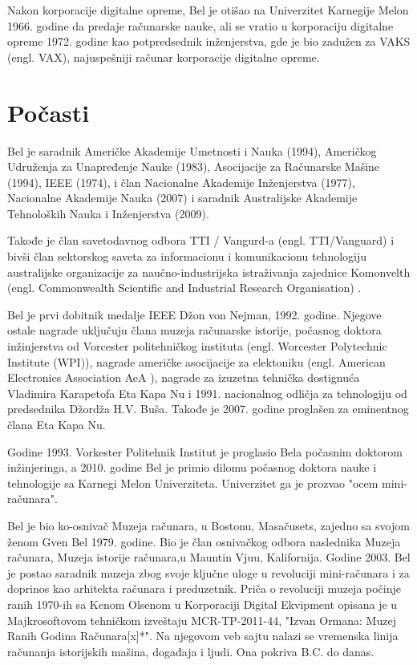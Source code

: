 \documentclass[a4paper]{article}
\begin{document}
{Nakon korporacije digitalne opreme, Bel je otišao na Univerzitet Karnegije Melon 1966. godine da predaje \-ra\-ču\-na\-rske nauke, ali se vratio u korporaciju digitalne opreme 1972. godine kao potpredsednik inženjerstva, gde je bio zadužen za VAKS (engl. VAX), najuspešniji računar korporacije digitalne opreme.


\section{Počasti}	
\label{sec:termini_i_citiranje}

Bel je saradnik Američke Akademije Umetnosti i Nauka (1994),\cite{bel3} Američkog Udruženja za Unapređenje Nauke (1983), Asocijacije za \-Ra\-ču\-nar\-ske Mašine (1994), IEEE (1974), i član Nacionalne Akademije \-Inže\-njer\-stva (1977), Nacionalne Akademije Nauka (2007) i saradnik Australijske Akademije Tehnoloških Nauka i Inženjerstva (2009).

Takođe je član savetodavnog odbora TTI / Vangurd-a (engl. TTI/Va\-nguard) i bivši član sektorskog saveta za informacionu i komunikacionu tehnologiju australijske organizacije za naučno-industrijska istraživanja zajednice Komonvelth (engl. Commonwealth Scientific and Industrial Research Organisation) .

Bel je prvi dobitnik medalje IEEE Džon von Nejman, 1992. godine.\cite{bel4} Njegove ostale nagrade uključuju člana muzeja računarske istorije, počasnog doktora inžinjerstva od Vorcester politehničkog instituta (engl. Worcester Polytechnic Institute (WPI)), nagrade američke asocijacije za elektoniku (engl. American Electronics Association AeA ), nagrade za izuzetna tehnička dostignuća Vladimira Karapetofa Eta Kapa Nu i 1991. nacionalnog odličja za tehnologiju od predsednika Džordža H.V. Buša. \cite{bel5} Takođe je 2007. godine proglašen za eminentnog člana Eta Kapa Nu.

Godine 1993. Vorkester Politehnik Institut je proglasio Bela počasnim doktorom inžinjeringa, a 2010. godine Bel je primio dilomu počasnog doktora nauke i tehnologije sa Karnegi Melon Univerziteta. Univerzitet ga je prozvao "ocem mini-računara".

Bel je bio ko-osnivač Muzeja računara, u Bostonu, Masačusets, zajedno sa svojom ženom Gven Bel 1979. godine. Bio je član osnivačkog odbora naslednika Muzeja računara, Muzeja istorije računara,u Mauntin Vjuu, Kalifornija. Godine 2003. Bel je postao saradnik muzeja zbog svoje ključne uloge u revoluciji mini-računara i za doprinos kao arhitekta računara i preduzetnik.\cite{bel6} Priča o revoluciji muzeja počinje ranih 1970-ih sa Kenom Olsenom u Korporaciji Digital Ekvipment opisana je u Majkrosoftovom tehničkom izveštaju MCR-TP-2011-44, "Izvan Ormana: Muzej Ranih Godina Računara[x]*". \cite{bel7} Na njegovom veb sajtu \cite{bel8} nalazi se vremenska linija računanja istorijskih mašina, događaja i ljudi. Ona pokriva B.C. do danas.




}
\end{document}
